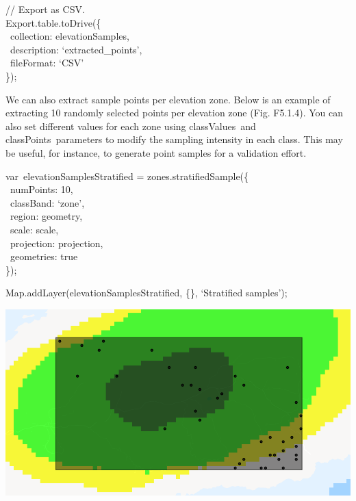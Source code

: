 \documentclass[
  letterpaper,
  DIV=11,
  numbers=noendperiod]{scrreprt}
\begin{document}
// Export as CSV.\\
Export.table.toDrive(\{\\
\hspace*{0.333em} ~collection: elevationSamples,\\
\hspace*{0.333em} ~description: `extracted\_points',\\
\hspace*{0.333em} ~fileFormat: `CSV'\\
\});

We can also extract sample points per elevation zone. Below is an
example of extracting 10 randomly selected points per elevation zone
(Fig. F5.1.4). You can also set different values for each zone using
classValues~and classPoints~parameters to modify the sampling intensity
in each class. This may be useful, for instance, to generate point
samples for a validation effort.

var~elevationSamplesStratified = zones.stratifiedSample(\{\\
\hspace*{0.333em} ~numPoints: 10,\\
\hspace*{0.333em} ~classBand: `zone',\\
\hspace*{0.333em} ~region: geometry,\\
\hspace*{0.333em} ~scale: scale,\\
\hspace*{0.333em} ~projection: projection,\\
\hspace*{0.333em} ~geometries: true\\
\});

Map.addLayer(elevationSamplesStratified, \{\}, `Stratified samples');

\includegraphics{./F5/image23.png}
\end{document}
